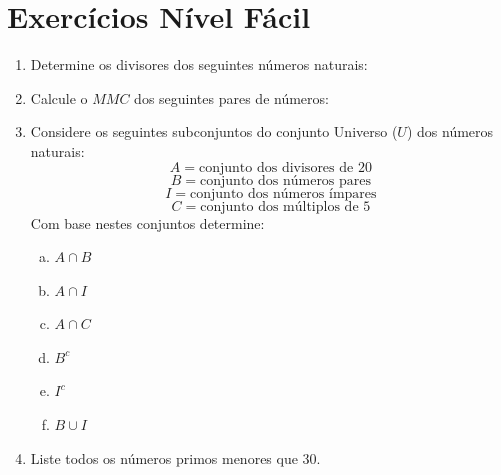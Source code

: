  
 \newpage
 
 \section{Exercícios Nível Fácil}
 \begin{enumerate}
  \item Determine os divisores dos seguintes números naturais:
  \begin{enumerate}
 \end{enumerate}
 
 \item Calcule o $MMC$ dos seguintes pares de números:
  \begin{enumerate}
 \end{enumerate}

  \item Considere os seguintes subconjuntos do conjunto Universo ($U$) dos números naturais:
  \[A= \text{conjunto dos divisores de } 20 \]
  \[B= \text{conjunto dos números pares}\]
  \[I= \text{conjunto dos números ímpares}\]
  \[C= \text{conjunto dos múltiplos de } 5 \]
  Com base nestes conjuntos determine:
  \begin{enumerate}[a)]
  \item $A \cap B$
  \item $A \cap I$
  \item $A \cap C$
  \item $B^{c}$
  \item $I^{c}$
  \item $B \cup I$
  \end{enumerate}
  
  \item Liste todos os números primos menores que 30.
  
 \end{enumerate}
 
